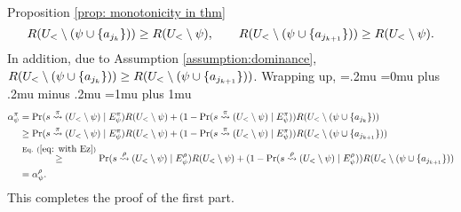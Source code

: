\begin{proofof}{Proposition \ref{prop: monotonicity in thm}}
\[
R(U_<\setminus (\psi\cup \{a_{j_k}\})) \geq R(U_<\setminus \psi), \qquad R(U_<\setminus (\psi\cup \{a_{j_{k+1}}\})) \geq R(U_<\setminus \psi).
\]
In addition, due to Assumption \ref{assumption:dominance}, $R(U_<\setminus (\psi\cup \{a_{j_k}\})) \geq  R(U_<\setminus (\psi\cup \{a_{j_{k+1}}\}))$. Wrapping up,
{\thinmuskip=.2mu
\medmuskip=0mu plus .2mu minus .2mu
\thickmuskip=1mu plus 1mu
\begin{align*}
\alpha^\pi_\psi&=\Pr(s\stackrel{\pi}{\rightsquigarrow}(U_<\setminus \psi)\mid E^\pi_\psi)R(U_<\setminus \psi)+(1-\Pr(s\stackrel{\pi}{\rightsquigarrow}(U_<\setminus \psi)\mid E^\pi_\psi))R(U_<\setminus (\psi \cup \{a_{j_k}\}))\\
&\geq \Pr(s\stackrel{\pi}{\rightsquigarrow}(U_<\setminus \psi)\mid E^\pi_\psi)R(U_<\setminus \psi)+(1-\Pr(s\stackrel{\pi}{\rightsquigarrow}(U_<\setminus \psi)\mid E^\pi_\psi))R(U_<\setminus (\psi \cup \{a_{j_{k+1}}\}))\\
&\stackrel{\textnormal{Eq. }(\ref{eq: with Ez})}{\geq} \Pr(s\stackrel{\rho}{\rightsquigarrow}(U_<\setminus \psi)\mid E^\rho_\psi)R(U_<\setminus \psi)+(1-\Pr(s\stackrel{\rho}{\rightsquigarrow}(U_<\setminus \psi)\mid E^\rho_\psi))R(U_<\setminus (\psi \cup \{a_{j_{k+1}}\}))\\
&=\alpha^\rho_\psi.
\end{align*}}%
This completes the proof of the first part.


\end{proofof}
